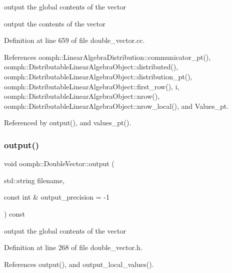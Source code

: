 output the global contents of the vector 

output the contents of the vector 

Definition at line 659 of file double\+\_\+vector.\+cc.



References oomph\+::\+Linear\+Algebra\+Distribution\+::communicator\+\_\+pt(), oomph\+::\+Distributable\+Linear\+Algebra\+Object\+::distributed(), oomph\+::\+Distributable\+Linear\+Algebra\+Object\+::distribution\+\_\+pt(), oomph\+::\+Distributable\+Linear\+Algebra\+Object\+::first\+\_\+row(), i, oomph\+::\+Distributable\+Linear\+Algebra\+Object\+::nrow(), oomph\+::\+Distributable\+Linear\+Algebra\+Object\+::nrow\+\_\+local(), and Values\+\_\+pt.



Referenced by output(), and values\+\_\+pt().

\mbox{\label{classoomph_1_1DoubleVector_ab236e5a906d16e8c7edc6b9acafa23e4}} 
\subsubsection{\texorpdfstring{output()}{output()}\hspace{0.1cm}{\footnotesize\ttfamily [2/2]}}
{\footnotesize\ttfamily void oomph\+::\+Double\+Vector\+::output (\begin{DoxyParamCaption}\item[{std\+::string}]{filename,  }\item[{const int \&}]{output\+\_\+precision = {\ttfamily -\/1} }\end{DoxyParamCaption}) const\hspace{0.3cm}{\ttfamily [inline]}}



output the global contents of the vector 



Definition at line 268 of file double\+\_\+vector.\+h.



References output(), and output\+\_\+local\+\_\+values().

\mbox{\label{classoomph_1_1DoubleVector_a2cdcd660a9a90868ba1f837095403649}} 
